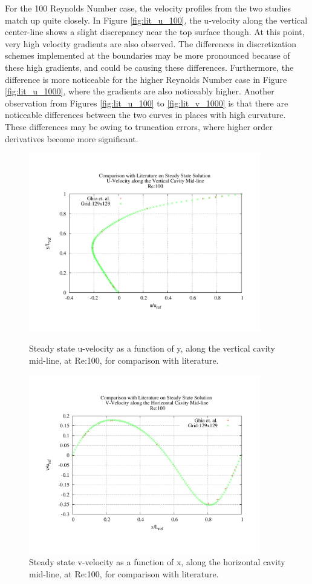 For the 100 Reynolds Number case, the velocity profiles from the two studies match up quite closely.  In Figure \ref{fig:lit_u_100}, the u-velocity along the vertical center-line shows a slight discrepancy near the top surface though.  At this point, very high velocity gradients are also observed.  The differences in discretization schemes implemented at the boundaries may be more pronounced because of these high gradients, and could be causing these differences. Furthermore, the difference is more noticeable for the higher Reynolds Number case in Figure \ref{fig:lit_u_1000}, where the gradients are also noticeably higher.  Another observation from Figures \ref{fig:lit_u_100} to \ref{fig:lit_v_1000} is that there are noticeable differences between the two curves in places with high curvature.  These differences may be owing to truncation errors, where higher order derivatives become more significant.


\begin{figure}[h!]
\center
\includegraphics[width=0.9\textwidth]{plots/lit_u_100}
\caption{Steady state u-velocity as a function of y, along the vertical cavity mid-line, at Re:100, for comparison with literature.}
\label{fig:lit_u_100}

\center
\includegraphics[width=0.9\textwidth]{plots/lit_v_100}
\caption{Steady state v-velocity as a function of x, along the horizontal cavity mid-line, at Re:100, for comparison with literature.}
\label{fig:lit_v_100}
\end{figure}


